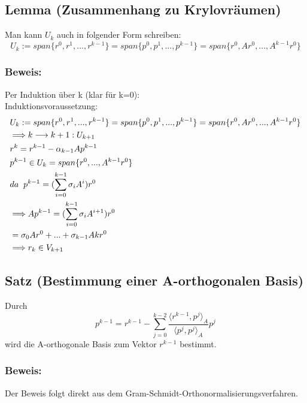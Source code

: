 \documentclass{article}
\begin{document}
\subsection{Lemma (Zusammenhang zu Krylovräumen)}
Man kann $U_{k}$ auch in folgender Form schreiben:
\begin{equation}
U_{k} := span\{r^{0}, r^{1},...,r^{k-1}\} = span\{p^{0},p^{1},...,p^{k-1}\} = span\{r^{0}, Ar^{0},...,A^{k-1}r^{0}\}
\end{equation}

\subsubsection{Beweis:}
Per Induktion über k (klar für k=0):
\\Induktionsvoraussetzung:
\begin{align*}
& U_{k} := span\{r^{0}, r^{1},...,r^{k-1}\} = span\{p^{0},p^{1},...,p^{k-1}\} = span\{r^{0}, Ar^{0},...,A^{k-1}r^{0}\}\\
& \Longrightarrow k \longrightarrow k+1: U_{k+1}\\
& r^{k} = r^{k-1} - \alpha_{k-1} Ap^{k-1}\\
& p^{k-1} \in U_{k} = span\{r^{0},...,A^{k-1}r^{0}\}\\
& da \hspace{2mm} p^{k-1} = (\sum_{i=0}^{k-1} \sigma_{i}A^{i})r^{0}\\
& \Longrightarrow Ap^{k-1} = (\sum_{i=0}^{k-1} \sigma_{i}A^{i+1})r^{0}\\
& = \sigma_{0}Ar^{0} + ... + \sigma_{k-1}A{k}r^{0}\\
& \Longrightarrow r_{k} \in V_{k+1}
\end{align*}

\subsection{Satz (Bestimmung einer A-orthogonalen Basis)}
Durch
\begin{equation}
p^{k-1} = r^{k-1} - \sum_{j=0}^{k-2} \frac {\langle r^{k-1}, p^{j} \rangle _{A}} {\langle p^{j}, p^{j} \rangle _{A}} p^{j}
\end{equation}
wird die A-orthogonale Basis zum Vektor $r^{k-1}$ bestimmt.

\subsubsection{Beweis:}
Der Beweis folgt direkt aus dem Gram-Schmidt-Orthonormalisierungsverfahren.
\end{document}
